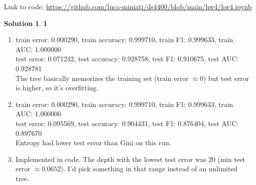 \documentclass[11pt]{article}
\theoremstyle{definition}
\theoremstyle{nopunct}
\newtheorem*{s}{Solution}
\begin{document}
Link to code: \href{https://github.com/luca-miniati/ds4400/blob/main/hw4/hw4.ipynb}{https://github.com/luca-miniati/ds4400/blob/main/hw4/hw4.ipynb}

\begin{s}\textbf{1}
    \begin{enumerate}
        \item train error: 0.000290, train accuracy: 0.999710, train F1: 0.999633, train AUC: 1.000000 \\
            test error: 0.071242, test accuracy: 0.928758, test F1: 0.910675, test AUC: 0.928781 \\
            The tree basically memorizes the training set (train error $\approx 0$) but test error is higher, so it's overfitting.

        \item train error: 0.000290, train accuracy: 0.999710, train F1: 0.999633, train AUC: 1.000000 \\
            test error: 0.095569, test accuracy: 0.904431, test F1: 0.876404, test AUC: 0.897670 \\
            Entropy had lower test error than Gini on this run.

        \item Implemented in code. The depth with the lowest test error was 20 (min test error $\approx 0.0652$). I'd pick something in that range instead of an unlimited tree.
    \end{enumerate}
\end{s}

\vspace{10pt}
\end{document}
